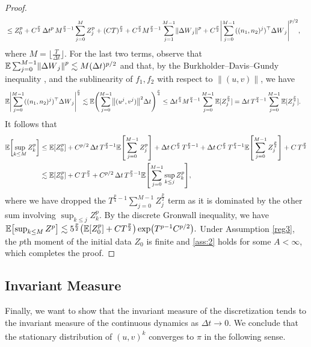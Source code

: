 \documentclass[11pt, twoside]{report}
\begin{document}
\begin{proof}
\begin{align*}
  &\leq Z_0^p + C^{\frac{p}2}  \,\deltat^p\, M^{\frac{p}{2}-1} \sum_{j=0}^M Z_j^{p} + (CT)^{\frac{p}{2}} + C^{\frac{p}{2}} M^{\frac{p}{2}-1} \sum_{j=1}^{M-1} \norm{\deltaw_j}^p + C^{\frac{p}{2}} \Biggl|\sum_{j=0}^{M-1} ((n_1,n_2)^j)^\top{\deltaw_j}\Biggr|^{p/2},
\end{align*}
where $M = \lfloor \frac{T}{\Delta t} \rfloor$. For the last two terms, observe that
  $\EE\sum_{j=0}^{M-1} \norm{\deltaw_j}^p \lesssim M (\deltat)^{p/2}$ and that, by the Burkholder--Davis--Gundy inequality \cite{10.1214/aop/1176997023}, and the sublinearity of $f_1,f_2$ with respect to $\|(u,v)\|$, we have \begin{align*}
   \EE \Biggl|\sum_{j=0}^{M-1} ((n_1,n_2)^j)^\top {\deltaw_j}\Biggr|^{\frac{p}2} &\lesssim \EE \Biggl(\sum_{j=0}^{M-1} \norm{(u^j,v^j)}^2 \deltat\Biggr)^{\frac{p}4}
    \leq \deltat^{\frac{p}4} M^{\frac{p}{4}-1}\sum_{j=0}^{M-1} \EE[Z_j^{\frac{p}2}]
    = \deltat\, T^{\frac{p}{4}-1} \sum_{j=0}^{M-1} \EE[Z_j^{\frac{p}2}].
    \end{align*}
It follows that
\begin{align*}
    \EE\bp{\sup_{k\leq M} Z_k^p}
&\leq \mean{Z_0^p} + C^{p/2}  \,\deltat \,T^{\frac{p}{2}-1} \mean{\sum_{j=0}^{M-1} Z_j^p} + \deltat\, C^{\frac{p}{2}}\, T^{\frac{p}{2}-1} +\deltat\, C^{ \frac{p}{2}} \,T^{\frac{p}{4}-1}\mean{\sum_{j=0}^{M-1} Z_j^{\frac{p}{2}}} + C\,T^{\frac{p}{2}}\\
&\lesssim \mean{Z_0^p} +C\,T^{\frac{p}{2}}+ C^{p/2}  \,\deltat \,T^{\frac{p}{2}-1} \mean{\sum_{j=0}^{M-1} \sup_{k\leq j} Z_k^p}, 
\end{align*}
where we have dropped the $T^{\frac{p}{4}-1}\sum_{j=0}^{M-1} Z_j^{\frac{p}{2}}$ term as it is dominated by the other sum involving $\sup_{k\leq j}Z_k^p$. By the discrete Gronwall inequality, we have
$
 \EE\bp{\sup_{k\leq M} Z^p} \lesssim  5^{\frac{p}2}  \pp{\mathbb{E}\bp{Z_0^p} + C T^{\frac{p}{2}}} \exp\bigl(T^{p-1} C^{p/2} \bigr).
$
Under Assumption \ref{reg3}, the $p$th moment of the initial data $Z_0$ is finite and \ref{ass:2} holds for some $A<\infty$, which completes the proof.
\end{proof}

\subsection{Invariant Measure}
Finally, we want to show that the invariant measure of the discretization tends to the invariant measure of the continuous dynamics as $\Delta t \xrightarrow[]{} 0$. We conclude that the stationary distribution of $(u,v)^k$ converges to $\pi$ in the following sense.
\end{document}
